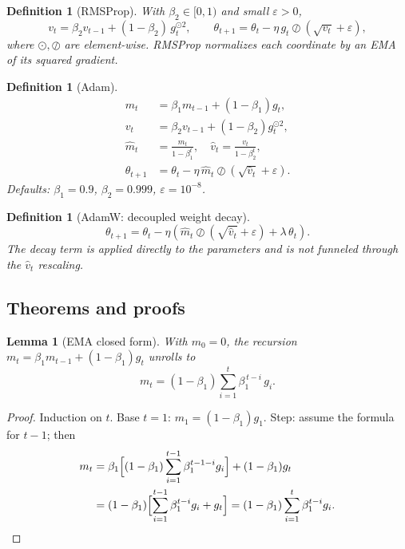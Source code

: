 \documentclass[11pt]{article}
\newtheorem{definition}[theorem]{Definition}
\newtheorem{lemma}[theorem]{Lemma}
\theoremstyle{remark}
\begin{document}
\begin{definition}[RMSProp]
With $\beta_2 \in [0,1)$ and small $\varepsilon > 0$,
\[
v_t = \beta_2 v_{t-1} + (1-\beta_2)\, g_t^{\odot 2}, \qquad \theta_{t+1} = \theta_t - \eta\, g_t \oslash (\sqrt{v_t} + \varepsilon),
\]
where $\odot,\oslash$ are element-wise. RMSProp normalizes each coordinate by an EMA of its squared gradient.
\end{definition}

\begin{definition}[Adam]
\begin{align*}
m_t &= \beta_1 m_{t-1} + (1-\beta_1) g_t, \\
v_t &= \beta_2 v_{t-1} + (1-\beta_2) g_t^{\odot 2}, \\
\hat m_t &= \frac{m_t}{1-\beta_1^t}, \quad \hat v_t = \frac{v_t}{1-\beta_2^t}, \\
\theta_{t+1} &= \theta_t - \eta\, \hat m_t \oslash (\sqrt{\hat v_t} + \varepsilon).
\end{align*}
Defaults: $\beta_1 = 0.9$, $\beta_2 = 0.999$, $\varepsilon = 10^{-8}$.
\end{definition}

\begin{definition}[AdamW: decoupled weight decay]
\[
\theta_{t+1} = \theta_t - \eta\!\left(\hat m_t \oslash (\sqrt{\hat v_t} + \varepsilon) + \lambda\, \theta_t\right).
\]
The decay term is applied directly to the parameters and is \emph{not} funneled through the $\hat v_t$ rescaling.
\end{definition}

\subsection*{Theorems and proofs}

\begin{lemma}[EMA closed form]
With $m_0 = 0$, the recursion $m_t = \beta_1 m_{t-1} + (1-\beta_1) g_t$ unrolls to
\[
m_t = (1-\beta_1)\sum_{i=1}^{t} \beta_1^{\,t-i}\, g_i.
\]
\end{lemma}
\begin{proof}
Induction on $t$. Base $t=1$: $m_1 = (1-\beta_1) g_1$. Step: assume the formula for $t-1$; then
\begin{align*}
m_t &= \beta_1\Bigl[(1-\beta_1)\sum_{i=1}^{t-1}\beta_1^{t-1-i}g_i\Bigr] + (1-\beta_1)g_t \\
&= (1-\beta_1)\Bigl[\sum_{i=1}^{t-1}\beta_1^{t-i}g_i + g_t\Bigr] = (1-\beta_1)\sum_{i=1}^{t}\beta_1^{t-i}g_i. \qedhere
\end{align*}
\end{proof}
\end{document}

